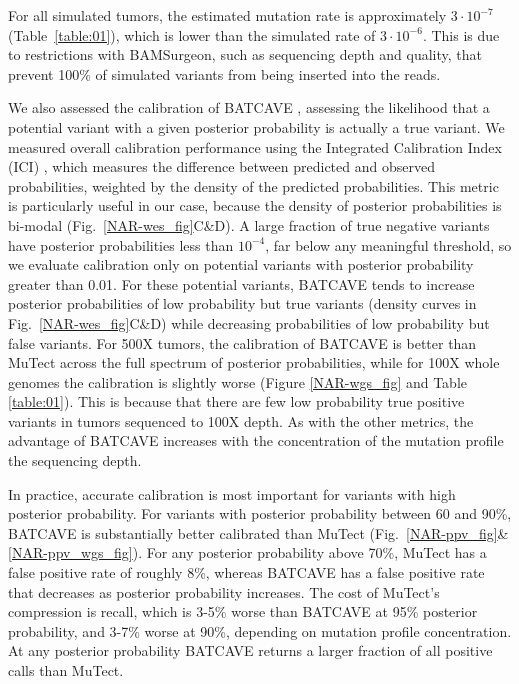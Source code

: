 \documentclass[a4,center,fleqn]{NAR}
\newcommand{\batcave}{BATCAVE }
\begin{document}
For all simulated tumors, the estimated mutation rate is approximately $3\cdot10^{-7}$ (Table~\ref{table:01}), which is lower than the simulated rate of $3\cdot10^{-6}$.
This is due to restrictions with BAMSurgeon, such as sequencing depth and quality, that prevent 100\% of simulated variants from being inserted into the reads.

We also assessed the calibration of \batcave, assessing the likelihood that a potential variant with a given posterior probability is actually a true variant.
We measured overall calibration performance using the Integrated Calibration Index (ICI) \cite{Austin2019}, which measures the difference between predicted and observed probabilities, weighted by the density of the predicted probabilities.
This metric is particularly useful in our case, because the density of posterior probabilities is bi-modal (Fig.~\ref{NAR-wes_fig}C\&D).
A large fraction of true negative variants have posterior probabilities less than $10^{-4}$, far below any meaningful threshold, so we evaluate calibration only on potential variants with posterior probability greater than 0.01.
For these potential variants, \batcave tends to increase posterior probabilities of low probability but true variants (density curves in Fig.~\ref{NAR-wes_fig}C\&D) while decreasing probabilities of low probability but false variants.
For 500X tumors, the calibration of \batcave is better than MuTect across the full spectrum of posterior probabilities, while for 100X whole genomes the calibration is slightly worse (Figure \ref{NAR-wgs_fig} and Table \ref{table:01}).
This is because that there are few low probability true positive variants in tumors sequenced to 100X depth.
As with the other metrics, the advantage of \batcave increases with the concentration of the mutation profile the sequencing depth.

In practice, accurate calibration is most important for variants with high posterior probability.
For variants with posterior probability between 60 and 90\%, \batcave is substantially better calibrated than MuTect (Fig.~\ref{NAR-ppv_fig}\&\ref{NAR-ppv_wgs_fig}).
For any posterior probability above 70\%, MuTect has a false positive rate of roughly 8\%, whereas \batcave has a false positive rate that decreases as posterior probability increases.
The cost of MuTect's compression is recall, which is 3-5\% worse than \batcave at 95\% posterior probability, and 3-7\% worse at 90\%, depending on mutation profile concentration.
At any posterior probability \batcave returns a larger fraction of all positive calls than MuTect.
\end{document}
